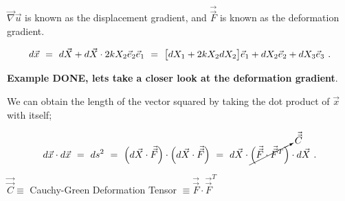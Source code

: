\documentclass{article}
\begin{document}
 \begin{math} \vec{\nabla}\vec{u} \end{math} is known as the displacement gradient, and \begin{math} \vec{\vec{F}} \end{math} is known as the deformation gradient. 

\vspace{-1.0cm}

\begin{equation} \label{eb-eq-1-75}
d \vec{x} \hspace{0.125cm} = \hspace{0.125cm} d \vec{X} + d \vec{X} \cdot 2 k X_2 \vec{e}_2 \vec{e}_1 \hspace{0.125cm} = \hspace{0.125cm} \big[ d X_1 + 2 k X_2 d X_2 \big] \vec{e}_1 + d X_2 \vec{e}_2 + d X_3 \vec{e}_3 \hspace{0.125cm} .
\end{equation} 

\textbf{Example DONE, lets take a closer look at the deformation gradient}. 

\vspace{1.5cm}

We can obtain the length of the vector squared by taking the dot product of \begin{math} \vec{x}  \end{math} with itself;

\vspace{-1.0cm}

\begin{equation} \label{eb-eq-1-76}
d \vec{x} \cdot d \vec{x} \hspace{0.125cm} = \hspace{0.125cm} ds^2 \hspace{0.125cm} = \hspace{0.125cm} \Big( d \vec{X} \cdot \vec{\vec{F}} \Big) \cdot \Big( d \vec{X} \cdot \vec{\vec{F}} \Big) \hspace{0.125cm} = \hspace{0.125cm} d \vec{X} \cdot \cancelto{\vec{\vec{C}}}{\Big( \vec{\vec{F}} \cdot \vec{\vec{F}}^T \Big)} \cdot d \vec{X} \hspace{0.125cm} .
\end{equation} 

\begin{math} \vec{\vec{C}} \equiv \end{math} Cauchy-Green Deformation Tensor \begin{math}  \equiv \vec{\vec{F}} \cdot \vec{\vec{F}}^T \end{math}
\end{document}
